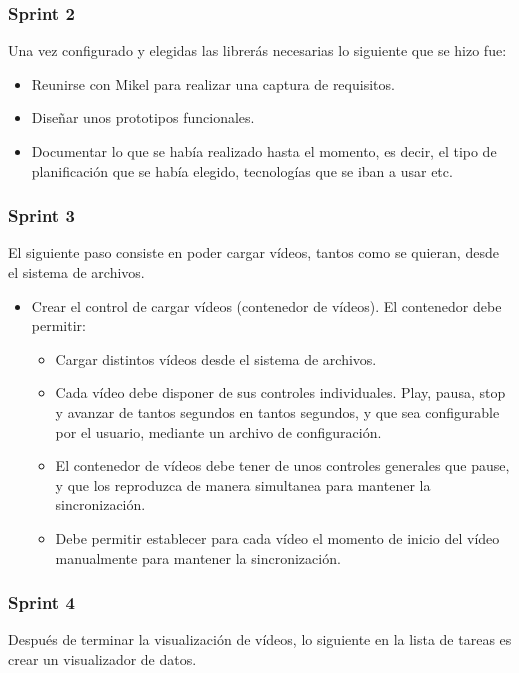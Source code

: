 \subsubsection{Sprint 2}
Una vez configurado y elegidas las librer\'{a}s necesarias lo siguiente que se hizo fue:

\begin{itemize}
    \item Reunirse con Mikel para realizar una captura de requisitos.
    \item Dise\~{n}ar unos prototipos funcionales.
    \item Documentar lo que se hab\'{i}a realizado hasta el momento, es decir, el tipo de planificaci\'{o}n que se hab\'{i}a elegido,
    tecnolog\'{i}as que se iban a usar etc.
\end{itemize}

\subsubsection{Sprint 3}
El siguiente paso consiste en poder cargar v\'{i}deos, tantos como se quieran, desde el sistema de archivos.

\begin{itemize}
    \item Crear el control de cargar v\'{i}deos (contenedor de v\'{i}deos). El contenedor debe permitir:
    \begin{itemize}
        \item Cargar distintos v\'{i}deos desde el sistema de archivos.
        \item Cada v\'{i}deo debe disponer de sus controles individuales. Play, pausa, stop y avanzar de tantos segundos en tantos segundos, y que sea
        configurable por el usuario, mediante un archivo de configuraci\'{o}n.
        \item El contenedor de v\'{i}deos debe tener de unos controles generales que pause, y que los reproduzca de manera simultanea
        para mantener la sincronizaci\'{o}n.
        \item Debe permitir establecer para cada v\'{i}deo el momento de inicio del v\'{i}deo manualmente para mantener la sincronizaci\'{o}n.
    \end{itemize}
\end{itemize}

\subsubsection{Sprint 4}
Despu\'{e}s de terminar la visualizaci\'{o}n de v\'{i}deos, lo siguiente en la lista de tareas es crear un visualizador de datos.

